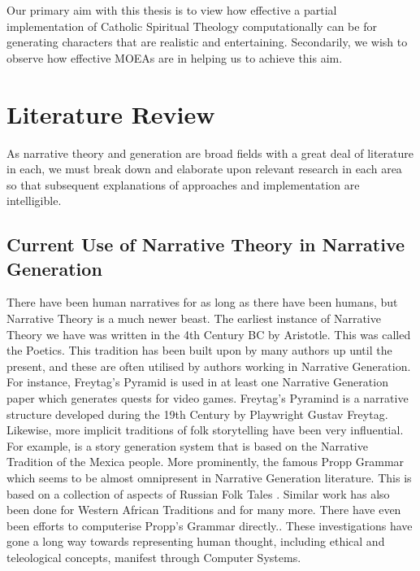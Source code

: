 \documentclass[12pt]{article}
\begin{document}
Our primary aim with this thesis is to view how effective a partial implementation of Catholic Spiritual Theology computationally can be for generating characters that are realistic and entertaining. Secondarily, we wish to observe how effective MOEAs are in helping us to achieve this aim. \\ 
\section{Literature Review}
As narrative theory and generation are broad fields with a great deal of literature in each, we must break down and elaborate upon relevant research in each area so that subsequent explanations of approaches and implementation are intelligible.

\subsection{Current Use of Narrative Theory in Narrative Generation}
There have been human narratives for as long as there have been humans, but Narrative Theory is a much newer beast. The earliest instance of Narrative Theory we have was written in the 4th Century BC by Aristotle. This was called the Poetics. This tradition has been built upon by many authors up until the present, and these are often utilised by authors working in Narrative Generation.  For instance, Freytag's Pyramid is used in at least one Narrative Generation paper which generates quests for video games\cite{questgeneration}.  Freytag's Pyramind is a narrative structure developed during the 19th Century by Playwright Gustav Freytag. Likewise, more implicit traditions of folk storytelling have been very influential. For example, \cite{MEXICA} is a story generation system that is based on the Narrative Tradition of the Mexica people. More prominently, the famous Propp Grammar which seems to be almost omnipresent in Narrative Generation literature. This is based on a collection of aspects of Russian Folk Tales \cite{propp1975morphology}. Similar work has also been done for Western African Traditions \cite{WestAfricanGeneration} and for many more.  There have even been efforts to computerise Propp's Grammar directly.\cite{Gervs2013ProppsMO}. These investigations have gone a long way towards representing human thought, including ethical and teleological concepts, manifest through Computer Systems. \\
\end{document}
